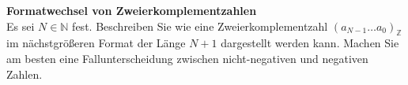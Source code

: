 \textbf{Formatwechsel von Zweierkomplementzahlen}\\
Es sei $N \in \mathbb{N}$ fest. Beschreiben Sie wie eine Zweierkomplementzahl $(a_{N-1}\dots a_0)_{\mathbb{Z}}$ im nächstgrößeren Format der Länge $N+1$ dargestellt werden kann. Machen Sie am besten eine Fallunterscheidung zwischen nicht-negativen und negativen Zahlen.
